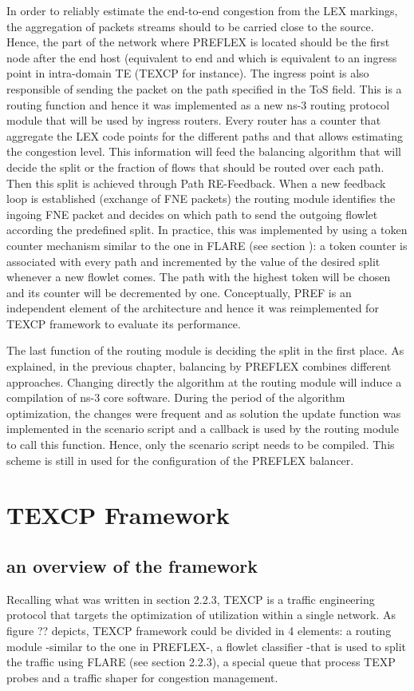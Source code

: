 In order to reliably estimate the end-to-end congestion from the LEX markings, the aggregation  of  packets streams should to be carried close to the source. Hence, the part of the network where PREFLEX is located should be the first node after the end host (equivalent to end  and which is equivalent to an ingress point in intra-domain TE (TEXCP for instance).  The ingress point is also responsible of sending the packet on the path specified in the ToS field. This is a routing function and hence it was implemented as a new ns-3 routing protocol module that will be used by ingress routers. Every router has a counter that aggregate the LEX code points for the different paths and that allows estimating the congestion level. This information will feed the balancing algorithm that will decide the split or the fraction of flows that should be routed over each path. Then this split is achieved through Path RE-Feedback. When a new feedback loop is established (exchange of FNE packets) the routing module identifies the ingoing FNE packet and decides on which path to send the outgoing flowlet  according the predefined split. In practice, this was implemented by using a token counter mechanism similar to the one in FLARE (see section ): a token counter is associated with every path and incremented by the value of the desired split whenever a new flowlet comes. The path with the highest token will be chosen and its counter will be decremented by one. Conceptually, PREF is an independent element of the architecture and hence it was reimplemented for TEXCP framework to evaluate its performance.

The last function of the routing module is deciding the split in the first place. As explained, in the previous chapter, balancing by PREFLEX combines different approaches. Changing directly the algorithm at the routing module will induce a compilation of ns-3 core software. During the period of the algorithm optimization, the changes were frequent and as solution the update function was implemented in the scenario script and a callback is used by the routing module to call this function. Hence, only the scenario script needs to be compiled. This scheme is still in used for the configuration of the PREFLEX balancer.

\section{TEXCP Framework}
		\subsection{an overview of the framework}
 	Recalling what was written in section 2.2.3, TEXCP is a traffic engineering protocol that targets the optimization of utilization within a single network. As figure ?? depicts, TEXCP framework could be divided in 4 elements: a routing module -similar to the one in PREFLEX-, a flowlet classifier -that is used to split the traffic using FLARE (see section 2.2.3), a special queue that process TEXP probes and a traffic shaper for congestion management. 

